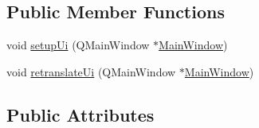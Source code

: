 \subsection*{Public Member Functions}
\begin{DoxyCompactItemize}
\item 
void \hyperlink{class_ui___main_window_acf4a0872c4c77d8f43a2ec66ed849b58}{setup\+Ui} (Q\+Main\+Window $\ast$\hyperlink{class_main_window}{Main\+Window})
\item 
void \hyperlink{class_ui___main_window_a097dd160c3534a204904cb374412c618}{retranslate\+Ui} (Q\+Main\+Window $\ast$\hyperlink{class_main_window}{Main\+Window})
\end{DoxyCompactItemize}
\subsection*{Public Attributes}
